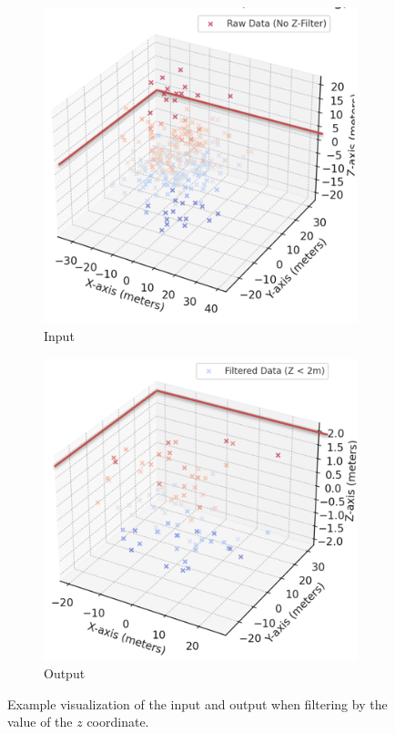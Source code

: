\begin{figure}[!htbp]
\centering
\begin{subfigure}{0.24\textwidth}
  \centering
  \includegraphics[width=\textwidth]{images/No_filter.png}
  \caption{Input}
\end{subfigure}
\begin{subfigure}{0.24\textwidth}
  \centering
  \includegraphics[width=\textwidth]{images/filter.png}
  \caption{Output}
\end{subfigure}
\caption{Example visualization of the input and output when filtering by the value of the $z$ coordinate.}
\label{fig:static_filter_z_example}
\end{figure}
\FloatBarrier\noindent



